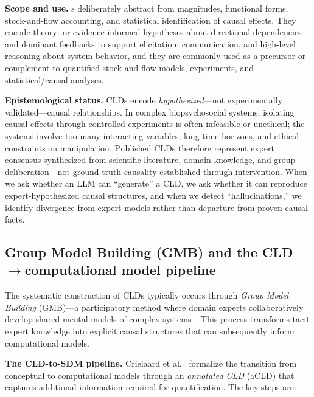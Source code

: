 \medskip
\noindent
\textbf{Scope and use.} \CLD s deliberately abstract from magnitudes, functional forms, stock-and-flow accounting, and statistical identification of causal effects. They encode theory- or evidence-informed hypotheses about directional dependencies and dominant feedbacks to support elicitation, communication, and high-level reasoning about system behavior, and they are commonly used as a precursor or complement to quantified stock-and-flow models, experiments, and statistical/causal analyses.

\medskip
\noindent
\textbf{Epistemological status.} CLDs encode \emph{hypothesized}---not experimentally validated---causal relationships. In complex biopsychosocial systems, isolating causal effects through controlled experiments is often infeasible or unethical; the systems involve too many interacting variables, long time horizons, and ethical constraints on manipulation. Published CLDs therefore represent expert consensus synthesized from scientific literature, domain knowledge, and group deliberation---not ground-truth causality established through intervention. When we ask whether an LLM can ``generate'' a CLD, we ask whether it can reproduce expert-hypothesized causal structures, and when we detect ``hallucinations,'' we identify divergence from expert models rather than departure from proven causal facts.

\subsection{Group Model Building (GMB) and the CLD$\rightarrow$computational model pipeline}
\label{sec:background_gmb}

The systematic construction of CLDs typically occurs through \emph{Group Model Building} (GMB)---a participatory method where domain experts collaboratively develop shared mental models of complex systems~\cite{crielaard2024refining}. This process transforms tacit expert knowledge into explicit causal structures that can subsequently inform computational models.

\medskip
\noindent
\textbf{The CLD-to-SDM pipeline.} Crielaard et al.~\cite{crielaard2024refining} formalize the transition from conceptual to computational models through an \emph{annotated CLD} (aCLD) that captures additional information required for quantification. The key steps are:

